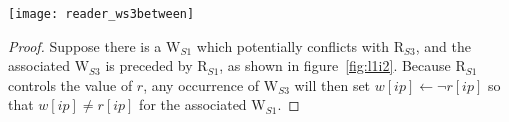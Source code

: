 \documentclass{article}
\newtheorem{lemma}{Lemma}
\newcommand\RS[1]{\ensuremath{\text{R}_{S#1}}}
\newcommand\WS[1]{\ensuremath{\text{W}_{S#1}}}
\newcommand\W[1]{\ensuremath{w\left[#1\right]}}
\newcommand\R[1]{\ensuremath{r\left[#1\right]}}
\newcommand\ip{\ensuremath{ip}}
\newcommand\op{\ensuremath{op}}
\begin{document}
\begin{figure*}[h]
  \centering
  \texttt{[image: reader\_ws3between]}
  \caption{\WS 3 occurs at least once between \RS 1 and completion of \RS 3}
  \label{fig:l1i2}
\end{figure*}

\begin{proof}
  Suppose there is a \WS1 which potentially conflicts with \RS3, and
  the associated \WS3 is preceded by \RS1, as shown in
  figure~\ref{fig:l1i2}. Because \RS1 controls the value of $r$, any
  occurrence of \WS3 will then set $\W{\ip}\gets\neg\R{\ip}$ so that
  $\W{\ip}\neq\R{\ip}$ for the associated \WS1.
\end{proof}


\end{document}
